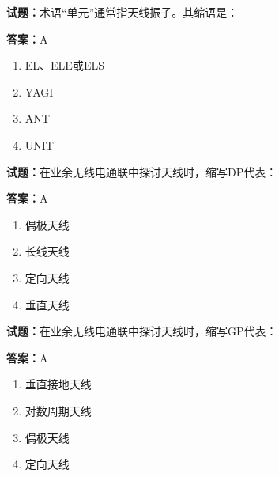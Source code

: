 \documentclass{ctexbook}
\begin{document}




\vspace{1em}

\textbf{试题：}术语“单元”通常指天线振子。其缩语是： 

\textbf{答案：}A 

\begin{enumerate}[leftmargin=3em]
  \item EL、ELE或ELS 

  \item YAGI 

  \item ANT 

  \item UNIT 

\end{enumerate}





\vspace{1em}

\textbf{试题：}在业余无线电通联中探讨天线时，缩写DP代表： 


\textbf{答案：}A 

\begin{enumerate}[leftmargin=3em]
  \item 偶极天线 

  \item 长线天线 

  \item 定向天线 

  \item 垂直天线 

\end{enumerate}





\vspace{1em}

\textbf{试题：}在业余无线电通联中探讨天线时，缩写GP代表： 

\textbf{答案：}A 

\begin{enumerate}[leftmargin=3em]
  \item 垂直接地天线 

  \item 对数周期天线 

  \item 偶极天线 

  \item 定向天线 

\end{enumerate}
\end{document}
